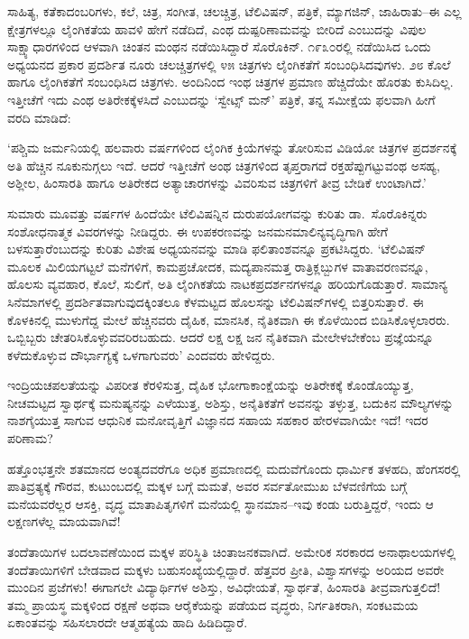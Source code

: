 ಸಾಹಿತ್ಯ, ಕತೆಕಾದಂಬರಿಗಳು, ಕಲೆ, ಚಿತ್ರ, ಸಂಗೀತ, ಚಲಚ್ಚಿತ್ರ, ಟೆಲಿವಿಷನ್, ಪತ್ರಿಕೆ, ಮ್ಯಾಗಜಿನ್, ಜಾಹಿರಾತು–ಈ ಎಲ್ಲ ಕ್ಷೇತ್ರಗಳಲ್ಲೂ ಲೈಂಗಿಕತೆಯ ಹಾವಳಿ ಹೇಗೆ ನಡೆದಿದೆ, ಎಂಥ ದುಷ್ಪರಿಣಾಮವನ್ನು ಬೀರಿದೆ ಎಂಬುದನ್ನು ವಿಪುಲ ಸಾಕ್ಷ್ಯಾಧಾರಗಳಿಂದ ಆಳವಾಗಿ ಚಿಂತನ ಮಂಥನ ನಡೆಯಿಸಿದ್ದಾರೆ ಸೊರೊಕಿನ್. ೧೯೩೦ರಲ್ಲಿ ನಡೆಯಿಸಿದ ಒಂದು ಅಧ್ಯಯನದ ಪ್ರಕಾರ ಪ್ರದರ್ಶಿತ ನೂರು ಚಲಚ್ಚಿತ್ರಗಳಲ್ಲಿ ೪೫ ಚಿತ್ರಗಳು ಲೈಂಗಿಕತೆಗೆ ಸಂಬಂಧಿಸಿದವುಗಳು. ೨೮ ಕೊಲೆ ಹಾಗೂ ಲೈಂಗಿಕತೆಗೆ ಸಂಬಂಧಿಸಿದ ಚಿತ್ರಗಳು. ಅಂದಿನಿಂದ ಇಂಥ ಚಿತ್ರಗಳ ಪ್ರಮಾಣ ಹೆಚ್ಚಿದೆಯೇ ಹೊರತು ಕುಸಿದಿಲ್ಲ. ಇತ್ತೀಚೆಗೆ ಇದು ಎಂಥ ಅತಿರೇಕಕ್ಕೆಳಸಿದೆ ಎಂಬುದನ್ನು ‘ಸ್ವೇಟ್ಸ್ ಮನ್​’ ಪತ್ರಿಕೆ, ತನ್ನ ಸಮೀಕ್ಷೆಯ ಫಲವಾಗಿ ಹೀಗೆ ವರದಿ ಮಾಡಿದೆ:

‘ಪಶ್ಚಿಮ ಜರ್ಮನಿಯಲ್ಲಿ ಹಲವಾರು ವರ್ಷಗಳಿಂದ ಲೈಂಗಿಕ ಕ್ರಿಯೆಗಳನ್ನು ತೋರಿಸುವ ವಿಡಿಯೋ ಚಿತ್ರಗಳ ಪ್ರದರ್ಶನಕ್ಕೆ ಅತಿ ಹೆಚ್ಚಿನ ನೂಕುನುಗ್ಗಲು ಇದೆ. ಆದರೆ ಇತ್ತೀಚೆಗೆ ಅಂಥ ಚಿತ್ರಗಳಿಂದ ತೃಪ್ತರಾಗದೆ ರಕ್ತಹೆಪ್ಪುಗಟ್ಟುವಂಥ ಅಸಹ್ಯ, ಅಶ್ಲೀಲ, ಹಿಂಸಾರತಿ ಹಾಗೂ ಅತಿರೇಕದ ಅತ್ಯಾಚಾರಗಳನ್ನು ವಿವರಿಸುವ ಚಿತ್ರಗಳಿಗೆ ತೀವ್ರ ಬೇಡಿಕೆ ಉಂಟಾಗಿದೆ.’

ಸುಮಾರು ಮೂವತ್ತು ವರ್ಷಗಳ ಹಿಂದೆಯೇ ಟೆಲಿವಿಷನ್ನಿನ ದುರುಪಯೋಗವನ್ನು ಕುರಿತು ಡಾ.\ ಸೊರೊಕಿನ್ನರು ಸಂಶೋಧನಾತ್ಮಕ ವಿವರಗಳನ್ನು ನೀಡಿದ್ದರು. ಈ ಉಪಕರಣವನ್ನು ಜನಮನ\-ಮಾಲಿನ್ಯವೃದ್ಧಿಗಾಗಿ ಹೇಗೆ ಬಳಸುತ್ತಾರೆಂಬುದನ್ನು ಕುರಿತು ವಿಶೇಷ ಅಧ್ಯಯನವನ್ನು ಮಾಡಿ ಫಲಿತಾಂಶವನ್ನೂ ಪ್ರಕಟಿಸಿದ್ದರು. ‘ಟೆಲಿವಿಷನ್ ಮೂಲಕ ಮಿಲಿಯಗಟ್ಟಲೆ ಮನೆಗಳಿಗೆ, ಕಾಮ\-ಪ್ರಚೋದಕ, ಮದ್ಯಪಾನಮತ್ತ ರಾತ್ರಿಕ್ಲಬ್ಬುಗಳ ವಾತಾವರಣವನ್ನೂ, ಹೊಲಸು ವ್ಯವಹಾರ, ಕೊಲೆ, ಸುಲಿಗೆ, ಅತಿ ಲೈಂಗಿಕತೆಯ ನಾಟಕಪ್ರದರ್ಶನಗಳನ್ನೂ ಹರಿಯಗೊಡುತ್ತಾರೆ. ಸಾಮಾನ್ಯ ಸಿನೆಮಾಗಳಲ್ಲಿ ಪ್ರದರ್ಶಿತವಾಗುವುದಕ್ಕಿಂತಲೂ ಕೆಳಮಟ್ಟದ ಹೊಲಸನ್ನು ಟೆಲಿವಿಷನ್​ಗಳಲ್ಲಿ ಬಿತ್ತರಿ\-ಸುತ್ತಾರೆ. ಈ ಕೊಳಕಿನಲ್ಲಿ ಮುಳುಗೆದ್ದ ಮೇಲೆ ಹೆಚ್ಚಿನವರು ದೈಹಿಕ, ಮಾನಸಿಕ, ನೈತಿಕವಾಗಿ ಈ ಕೊಳೆಯಿಂದ ಬಿಡಿಸಿಕೊಳ್ಳಲಾರರು. ಒಬ್ಬಿಬ್ಬರು ಚೇತರಿಸಿಕೊಳ್ಳುವವರಿರಬಹುದು. ಆದರೆ ಲಕ್ಷ ಲಕ್ಷ ಜನ ನೈತಿಕವಾಗಿ ಮೇಲೇಳಬೇಕೆಂಬ ಪ್ರಜ್ಞೆಯನ್ನೂ ಕಳೆದುಕೊಳ್ಳುವ ದೌರ್ಭಾಗ್ಯಕ್ಕೆ ಒಳಗಾಗುವರು’ ಎಂದವರು ಹೇಳಿದ್ದರು.

ಇಂದ್ರಿಯಚಪಲತೆಯನ್ನು ವಿಪರೀತ ಕೆರಳಿಸುತ್ತ, ದೈಹಿಕ ಭೋಗಾಕಾಂಕ್ಷೆಯನ್ನು ಅತಿರೇಕಕ್ಕೆ ಕೊಂಡೊಯ್ಯುತ್ತ, ನೀಚಮಟ್ಟದ ಸ್ವಾರ್ಥಕ್ಕೆ ಮನುಷ್ಯನನ್ನು ಎಳೆಯುತ್ತ, ಅಶಿಸ್ತು, ಅನೈತಿಕತೆಗೆ ಅವನನ್ನು ತಳ್ಳುತ್ತ, ಬದುಕಿನ ಮೌಲ್ಯಗಳನ್ನು ನಾಶಗೈಯುತ್ತ ಸಾಗುವ ಆಧುನಿಕ ಮನೋವೃತ್ತಿಗೆ ವಿಜ್ಞಾನದ ಸಹಾಯ ಸಹಕಾರ ಹೇರಳವಾಗಿಯೇ ಇದೆ! ಇದರ ಪರಿಣಾಮ?

ಹತ್ತೊಂಭತ್ತನೇ ಶತಮಾನದ ಅಂತ್ಯದವರೆಗೂ ಅಧಿಕ ಪ್ರಮಾಣದಲ್ಲಿ ಮದುವೆಗೊಂದು ಧಾರ್ಮಿಕ ತಳಹದಿ, ಹೆಂಗಸರಲ್ಲಿ ಪಾತಿವ್ರತ್ಯಕ್ಕೆ ಗೌರವ, ಕುಟುಂಬದಲ್ಲಿ ಮಕ್ಕಳ ಬಗ್ಗೆ ಮಮತೆ, ಅವರ ಸರ್ವತೋಮುಖ ಬೆಳವಣಿಗೆಯ ಬಗ್ಗೆ ಮನೆಯವರೆಲ್ಲರ ಆಸಕ್ತಿ, ವೃದ್ಧ ಮಾತಾಪಿತೃಗಳಿಗೆ ಮನೆಯಲ್ಲಿ ಸ್ಥಾನಮಾನ–ಇವು ಕಂಡು ಬರುತ್ತಿದ್ದರೆ, ಇಂದು ಆ ಲಕ್ಷಣಗಳೆಲ್ಲ ಮಾಯವಾಗಿವೆ!

ತಂದೆತಾಯಿಗಳ ಬದಲಾವಣೆಯಿಂದ ಮಕ್ಕಳ ಪರಿಸ್ಥಿತಿ ಚಿಂತಾಜನಕವಾಗಿದೆ. ಅಮೇರಿಕ ಸರಕಾರದ ಅನಾಥಾಲಯಗಳಲ್ಲಿ ತಂದೆತಾಯಿಗಳಿಗೆ ಬೇಡವಾದ ಮಕ್ಕಳು ಬಹುಸಂಖ್ಯೆಯಲ್ಲಿದ್ದಾರೆ. ಹೆತ್ತವರ ಪ್ರೀತಿ, ವಿಶ್ವಾಸಗಳನ್ನು ಅರಿಯದ ಅವರೇ ಮುಂದಿನ ಪ್ರಜೆಗಳು! ಈಗಾಗಲೇ ವಿದ್ಯಾರ್ಥಿಗಳ ಅಶಿಸ್ತು, ಅವಿಧೇಯತೆ, ಸ್ವಾರ್ಥತೆ, ಹಿಂಸಾರತಿ ತೀವ್ರವಾಗುತ್ತಲಿದೆ! ತಮ್ಮ ಪ್ರಾಯಸ್ಥ ಮಕ್ಕಳಿಂದ ರಕ್ಷಣೆ ಅಥವಾ ಆರೈಕೆಯನ್ನು ಪಡೆಯದ ವೃದ್ಧರು, ನಿರ್ಗತಿಕರಾಗಿ, ಸಂಕಟಮಯ ಏಕಾಂತವನ್ನು ಸಹಿಸಲಾರದೇ ಆತ್ಮಹತ್ಯೆಯ ಹಾದಿ ಹಿಡಿದಿದ್ದಾರೆ.

